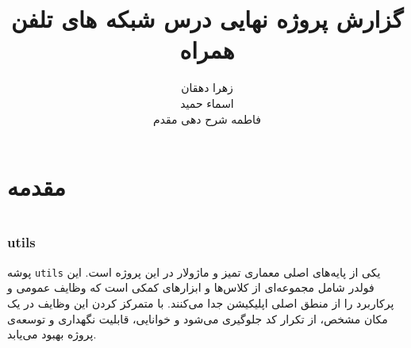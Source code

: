 \documentclass{report}
\title{گزارش پروژه نهایی درس شبکه های تلفن همراه}
\author{زهرا دهقان\\اسماء حمید\\فاطمه شرح دهی مقدم}
\begin{document}
\Godpage
\maketitle
{}
\tableofcontents


\chapter{مقدمه}



\chapter{ }

\chapter{ }

\section{ }

\section{ }

\subsection{  utils}
پوشه \texttt{utils} یکی از پایه‌های اصلی معماری تمیز و ماژولار در این پروژه است. این فولدر شامل مجموعه‌ای از کلاس‌ها و ابزارهای کمکی است که وظایف عمومی و پرکاربرد را از منطق اصلی اپلیکیشن جدا می‌کنند. با متمرکز کردن این وظایف در یک مکان مشخص، از تکرار کد جلوگیری می‌شود و خوانایی، قابلیت نگهداری و توسعه‌ی پروژه بهبود می‌یابد. \\
\end{document}
